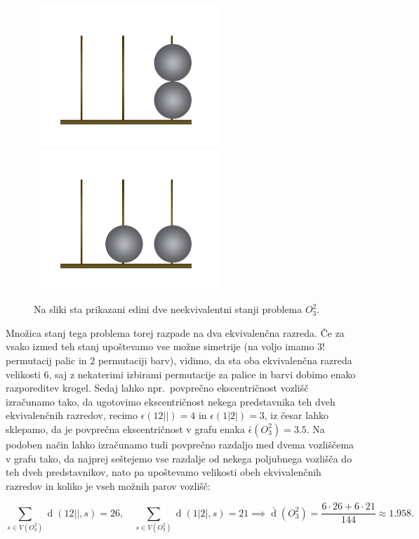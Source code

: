 \documentclass[12pt,a4paper]{amsart}
\theoremstyle{definition} %
\theoremstyle{plain} %
\DeclareMathOperator{\distance}{d}
\begin{document}
\begin{figure}[h]
    \includegraphics[width=200pt]{img/oxford-tower-O^2_3-towerlike.png}
    \includegraphics[width=200pt]{img/oxford-tower-O^2_3-flat.png}
    \caption{Na sliki sta prikazani edini dve neekvivalentni stanji problema $O^2_3$. }
    \label{fig:neekviv-oxf-stanji}
\end{figure}

Množica stanj tega problema torej razpade na dva ekvivalenčna razreda. Če za vsako izmed teh stanj upoštevamo vse možne simetrije (na voljo imamo $3!$ permutacij palic in $2$ permutaciji barv), vidimo, da sta oba ekvivalenčna razreda velikosti $6$, saj z nekaterimi izbirami permutacije za palice in barvi dobimo enako razporeditev krogel. Sedaj lahko npr.\ povprečno ekscentričnost vozlišč izračunamo tako, da ugotovimo ekscentričnost nekega predstavnika teh dveh ekvivalenčnih razredov, recimo $\epsilon(12||) = 4$ in $\epsilon(1|2|) = 3$, iz česar lahko sklepamo, da je povprečna ekscentričnost v grafu enaka $\bar{\epsilon}(O^2_3) = 3.5$. Na podoben način lahko izračunamo tudi povprečno razdaljo med dvema vozliščema v grafu tako, da najprej seštejemo vse razdalje od nekega poljubnega vozlišča do teh dveh predstavnikov, nato pa upoštevamo velikosti obeh ekvivalenčnih razredov in koliko je vseh možnih parov vozlišč:

\[ \sum_{s \in V(O_3^2)} \distance(12||,s) = 26,\quad \sum_{s \in V(O_3^2)} \distance(1|2|,s) = 21 \implies \bar{\distance}(O^2_3) = \frac{6 \cdot 26 + 6 \cdot 21}{144} \approx 1.958.\]
\end{document}
